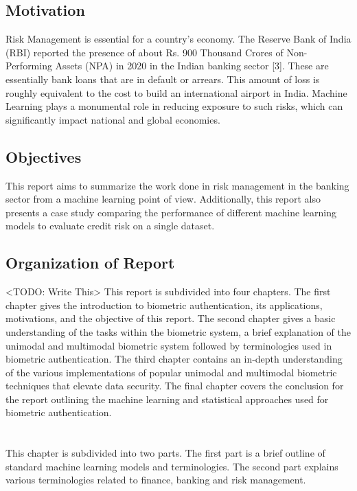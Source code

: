 \documentclass[a4paper, 12pt]{article}
\begin{document}
\vskip 0.2in
\subsection{Motivation}
Risk Management is essential for a country's economy. The Reserve Bank of India (RBI) reported the presence of about Rs. 900 Thousand Crores of Non-Performing Assets (NPA) in 2020 in the Indian banking sector [3]. These are essentially bank loans that are in default or arrears. This amount of loss is roughly equivalent to the cost to build an international airport in India. Machine Learning plays a monumental role in reducing exposure to such risks, which can significantly impact national and global economies.
\vskip 0.2in
\subsection{Objectives}
This report aims to summarize the work done in risk management in the banking sector from a machine learning point of view. Additionally, this report also presents a case study comparing the performance of different machine learning models to evaluate credit risk on a single dataset.
\vskip 0.2in
\subsection{Organization of Report}
<TODO: Write This>
This report is subdivided into four chapters. The first chapter gives the introduction to biometric authentication, its applications, motivations, and the objective of this report. The second chapter gives a basic understanding of the tasks within the biometric system, a brief explanation of the unimodal and multimodal biometric system followed by terminologies used in biometric authentication. The third chapter contains an in-depth understanding of the various implementations of popular unimodal and multimodal biometric techniques that elevate data security. The final chapter covers the conclusion for the report outlining the machine learning and statistical approaches used for biometric authentication.
\newpage

\section{}
\vskip 0.25in
This chapter is subdivided into two parts. The first part is a brief outline of standard machine learning models and terminologies. The second part explains various terminologies related to finance, banking and risk management.
\vskip 0.2in
\end{document}
